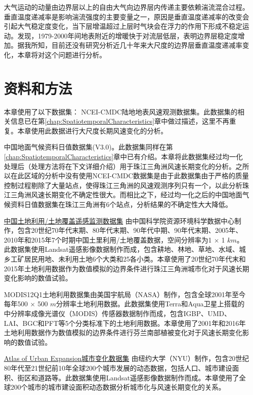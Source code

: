 大气运动的动量由边界层以上的自由大气向边界层内传递主要依赖湍流混合过程。垂直温度递减率是影响湍流强度的主要变量之一，原因是垂直温度递减率的改变会引起大气稳定度变化，当下层增温超过上层时气块会在浮力的作用下形成不稳定运动\citep{J2004An}。\citet{gaffen2000multidecadal}发现，1979-2000年间地表附近的增暖快于对流层低层，表明边界层稳定度增加。据我所知，目前还没有研究分析近几十年来大尺度的边界层垂直温度递减率变化，本章将对这个问题进行分析。

\section{资料和方法}

本章使用了以下数据集：
NCEI-CMDC陆地地表风速观测数据集。此数据集的相关信息已在第\ref{chap:SpatiotemporalCharacteristics}章中做过描述，这里不再重复。本章使用此数据进行大尺度长期风速变化的分析。

中国地面气候资料日值数据集(V3.0)。此数据集同样在第\ref{chap:SpatiotemporalCharacteristics}章中已有介绍。本章将此数据集经过均一化处理后（处理方法将在下文详细介绍）用于珠江三角洲风速长期变化的分析。之所以在此区域的分析中没有使用NCEI-CMDC数据集是由于此数据集由于严格的质量控制过程剔除了大量站点，使得珠江三角洲的风速观测序列只有一个，以此分析珠江三角洲风速长期变化不确定性很大。而相比之下，经过均一化之后的中国地面气候资料日值数据集在珠江三角洲有6个站点，分析结果的不确定性大大降低。

\href{http://www.resdc.cn}{中国土地利用/土地覆盖遥感监测数据集} 由中国科学院资源环境科学数据中心制作，包含20世纪70年代末期、80年代末期、90年代中期、90年代末期、2005年、2010年和2015年7个时期中国土里利用/土地覆盖数据，空间分辨率为1 $\times$ 1 $km$。此数据集使用Landsat遥感影像数据制作而成，包含耕地、林地、草地、水域、城乡工矿居民用地、未利用土地6个大类和25各小类。本章使用了20世纪70年代末和2015年土地利用数据作为数值模拟的边界条件进行珠江三角洲城市化对于风速长期变化影响的数值试验。

MODIS12Q1土地利用数据集\citep{sullamenashe2019hierarchical}由美国宇航局（NASA）制作，包含全球2001年至今每年500 $\times$ 500 $m$分辨率土地利用数据。此数据集使用Terra和Aqua卫星上搭载的中分辨率成像光谱仪（MODIS）传感器数据制作而成，包含IGBP、UMD、LAI、BGC和PFT等5个分类标准下的土地利用数据。本章使用了2001年和2016年土地利用数据作为数值模拟的边界条件进行芬兰南部植被变化对于风速长期变化影响的数值试验。

\href{http://www.atlasofurbanexpansion.org/data}{Atlas of Urban Expansion城市变化数据集} 由纽约大学（NYU）制作，包含20世纪80年代至21世纪前10年全球200个城市发展的动态数据，包括人口、城市建设面积、街区和道路等。此数据集使用Landsat遥感影像数据制作而成。本章使用了全球200个城市的城市建设面积动态数据分析城市化与风速长期变化的关系。


